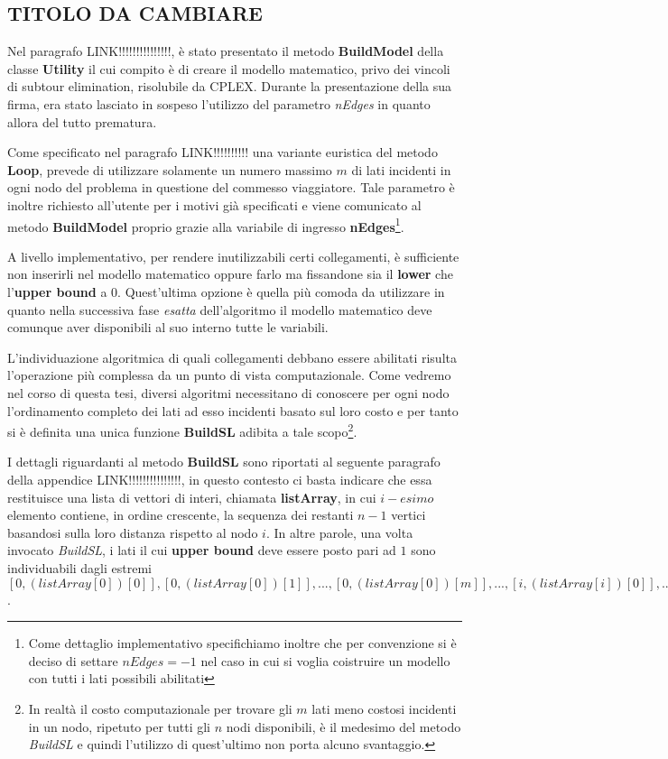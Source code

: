 \documentclass[11pt]{article}
\begin{document}
\subsection*{TITOLO DA CAMBIARE}
\label{sec:TitoloS}

Nel paragrafo LINK!!!!!!!!!!!!!!!, è stato presentato il metodo \textbf{BuildModel} della classe \textbf{Utility} il cui compito è di creare il modello matematico, privo dei vincoli di subtour elimination, risolubile da CPLEX. Durante la presentazione della sua firma, era stato lasciato in sospeso l'utilizzo del parametro \textit{nEdges} in quanto allora del tutto prematura.

Come specificato nel paragrafo LINK!!!!!!!!!! una variante euristica del metodo \textbf{Loop}, prevede di utilizzare solamente un numero massimo $m$ di lati incidenti in ogni nodo del problema in questione del commesso viaggiatore. Tale parametro è inoltre richiesto all'utente per i motivi già specificati e viene comunicato al metodo \textbf{BuildModel} proprio grazie alla variabile di ingresso \textbf{nEdges}\footnote{Come dettaglio implementativo specifichiamo inoltre che per convenzione si è deciso di settare $nEdges = -1$ nel caso in cui si voglia coistruire un modello con tutti i lati possibili abilitati}.

A livello implementativo, per rendere inutilizzabili certi collegamenti, è sufficiente non inserirli nel modello matematico oppure farlo ma fissandone sia il \textbf{lower} che l'\textbf{upper bound} a 0. Quest'ultima opzione è quella più comoda da utilizzare in quanto nella successiva fase \textit{esatta} dell'algoritmo il modello matematico deve comunque aver disponibili al suo interno tutte le variabili.

L'individuazione algoritmica di quali collegamenti debbano essere abilitati risulta l'operazione più complessa da un punto di vista computazionale. Come vedremo nel corso di questa tesi, diversi algoritmi necessitano di conoscere per ogni nodo l'ordinamento completo dei lati ad esso incidenti basato sul loro costo e per tanto si è definita una unica funzione \textbf{BuildSL} adibita a tale scopo\footnote{In realtà il costo computazionale per trovare gli $m$ lati meno costosi incidenti in un nodo, ripetuto per tutti gli $n$ nodi disponibili, è il medesimo del metodo \textit{BuildSL} e quindi l'utilizzo di quest'ultimo non porta alcuno svantaggio.}.

I dettagli riguardanti al metodo \textbf{BuildSL} sono riportati al seguente paragrafo della appendice LINK!!!!!!!!!!!!!!!, in questo contesto ci basta indicare che essa restituisce una lista di vettori di interi, chiamata \textbf{listArray}, in cui $i-esimo$ elemento contiene, in ordine crescente, la sequenza dei restanti $n-1$ vertici basandosi sulla loro distanza rispetto al nodo $i$. In altre parole, una volta invocato \textit{BuildSL}, i lati il cui \textbf{upper bound} deve essere posto pari ad $1$ sono individuabili dagli estremi $[0,(listArray[0])[0]], [0,(listArray[0])[1]], ..., [0,(listArray[0])[m]], ..., [i,(listArray[i])[0]], ..., [i,(listArray[i])[m]], ..., [n-1,(listArray[n-1])[0]], ..., [n-1,(listArray[n-1])[m]]$.
\end{document}
